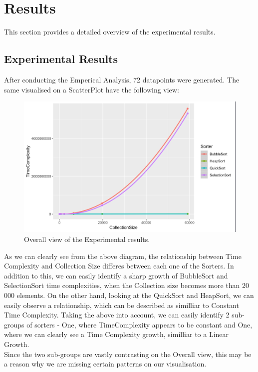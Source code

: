 \documentclass[]{report}
\begin{document}
		\section{Results}
	This section provides a detailed overview of the experimental results.
\subsection{Experimental Results}
After conducting the Emperical Analysis, 72 datapoints were generated. The same visualised on a ScatterPlot have the following view:

\begin{figure}
	\centering
	\includegraphics[width=0.7\linewidth]{ResultsOverallView}
	\caption[Figure 3.1:]{Overall view of the Experimental results.}
	\label{fig:resultsoverallview}
\end{figure}
\newpage
As we can clearly see from the above diagram, the relationship between Time Complexity and Collection Size differes between each one of the Sorters. In addition to this, we can easily identify a sharp growth of BubbleSort and SelectionSort time complexities, when the Collection size becomes more than 20 000 elements. On the other hand, looking at the QuickSort and HeapSort, we can easily observe a relationship, which can be described as similliar to Constant Time Complexity.
Taking the above into account, we can easily identify 2 sub-groups of sorters - One, where  TimeComplexity appears to be constant and One, where we can clearly see a Time Complexity growth, similliar to a Linear Growth.\\
Since the two sub-groups are vastly contrasting on the Overall view, this may be a reason why we are missing certain patterns on our visualisation.
\end{document}
